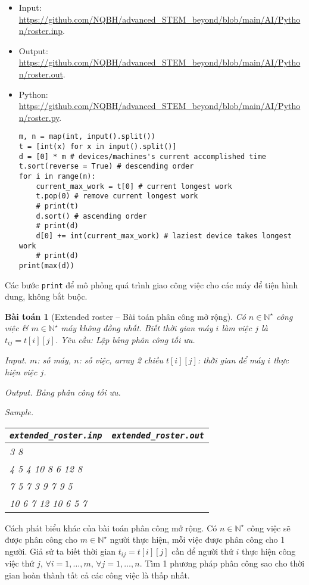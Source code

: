 \documentclass{article}
\newtheorem{baitoan}{Bài toán}
\begin{document}
\begin{itemize}
	\item Input: \url{https://github.com/NQBH/advanced_STEM_beyond/blob/main/AI/Python/roster.inp}.
	\item Output: \url{https://github.com/NQBH/advanced_STEM_beyond/blob/main/AI/Python/roster.out}.
	\item Python: \url{https://github.com/NQBH/advanced_STEM_beyond/blob/main/AI/Python/roster.py}.
\begin{verbatim}
m, n = map(int, input().split())
t = [int(x) for x in input().split()]
d = [0] * m # devices/machines's current accomplished time
t.sort(reverse = True) # descending order
for i in range(n):
    current_max_work = t[0] # current longest work
    t.pop(0) # remove current longest work
    # print(t)
    d.sort() # ascending order
    # print(d)
    d[0] += int(current_max_work) # laziest device takes longest work
    # print(d)
print(max(d))
\end{verbatim}
\end{itemize}
Các bước {\tt print} để mô phỏng quá trình giao công việc cho các máy để tiện hình dung, không bắt buộc.

\begin{baitoan}[Extended roster -- Bài toán phân công mở rộng]
	Có $n\in\mathbb{N}^\star$ công việc \& $m\in\mathbb{N}^\star$ máy không đồng nhất. Biết thời gian máy $i$ làm việc $j$ là $t_{ij} = t[i][j]$. Yêu cầu: Lập bảng phân công tối ưu.
	\item {\sf Input.} $m$: số máy, $n$: số việc, array 2 chiều $t[i][j]$: thời gian để máy $i$ thực hiện việc $j$.
	\item {\sf Output.} Bảng phân công tối ưu.
	\item {\sf Sample.}
	\begin{table}[H]
		\centering
		\begin{tabular}{|l|l|}
			\hline
			\verb|extended_roster.inp| & \verb|extended_roster.out| \\
			\hline
			3 8 &  \\
			4 5 4 10 8 6 12 8 &  \\
			7 5 7 3 9 7 9 5 &  \\
			10 6 7 12 10 6 5 7 &  \\
			\hline
		\end{tabular}
	\end{table}
\end{baitoan}
{\sf Cách phát biểu khác của bài toán phân công mở rộng.} Có $n\in\mathbb{N}^\star$ công việc sẽ được phân công cho $m\in\mathbb{N}^\star$ người thực hiện, mỗi việc được phân công cho 1 người. Giả sử ta biết thời gian $t_{ij} = t[i][j]$ cần để người thứ $i$ thực hiện công việc thứ $j$, $\forall i = 1,\ldots,m$, $\forall j = 1,\ldots,n$. Tìm 1 phương pháp phân công sao cho thời gian hoàn thành tất cả các công việc là thấp nhất.
\end{document}
